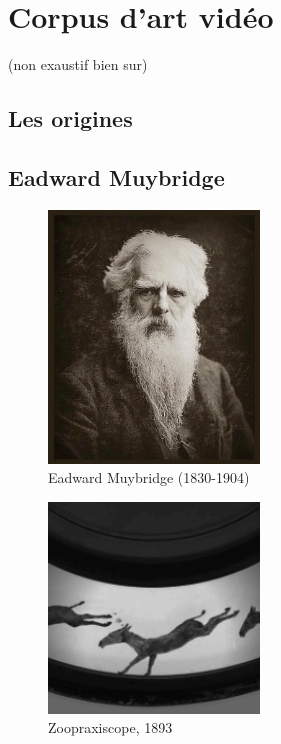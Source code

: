 \documentclass[
]{book}
\begin{document}
\hypertarget{corpus}{%
\chapter{Corpus d'art vidéo}\label{corpus}}

(non exaustif bien sur)

\hypertarget{les-origines}{%
\section{Les origines}\label{les-origines}}

\hypertarget{eadward-muybridge}{%
\section{Eadward Muybridge}\label{eadward-muybridge}}

\begin{figure}
\centering
\includegraphics[width=0.5\textwidth,height=\textheight]{medias/corpus/muybridge/Optic_Projection_fig_411.jpg}
\caption{Eadward Muybridge (1830-1904)}
\end{figure}

\begin{figure}
\centering
\includegraphics[width=0.5\textwidth,height=\textheight]{medias/corpus/muybridge/Zoopraxiscope_16485d.gif}
\caption{Zoopraxiscope, 1893}
\end{figure}
\end{document}

